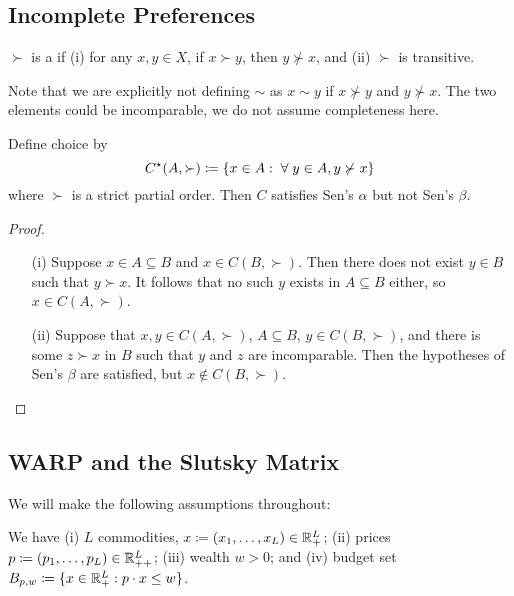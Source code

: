 \documentclass[12pt]{article}
\begin{document}
\subsection{Incomplete Preferences}

\begin{definition}
	$\succ$ is a  if (i) for any $x,y \in X$, if $x \succ y$, then $y \not\succ x$, and (ii) $\succ$ is transitive.
\end{definition}
\begin{remark}
	Note that we are explicitly not defining $\sim$ as $x \sim y$ if $x \not\succ y$ and $y \not\succ x$. The two elements could be incomparable, we do not assume completeness here.
\end{remark}

\begin{proposition}\label{prop:partial_order}
	Define choice by
	\[
	C\opt(A,\succ) \coloneqq \{x \in A : \forall y \in A, y\not\succ x\}
	\]
	where $\succ$ is a strict partial order. Then $C$ satisfies Sen's $\alpha$ but not Sen's $\beta$.
\end{proposition}
\begin{proof}
	
	\begin{itemize}
		\item[(i)] Suppose $x \in A \subseteq B$ and $x \in C(B,\succ)$. Then there does not exist $y \in B$ such that $y \succ x$. It follows that no such $y$ exists in $A \subseteq B$ either, so $x \in C(A,\succ)$.
		
		\item[(ii)] Suppose that $x,y \in C(A,\succ)$, $A \subseteq B$, $y \in C(B,\succ)$, and there is some $z \succ x$ in $B$ such that $y$ and $z$ are incomparable. Then the hypotheses of Sen's $\beta$ are satisfied, but $x \not\in C(B,\succ)$.
	\end{itemize}
\end{proof}

\subsection{WARP and the Slutsky Matrix}

We will make the following assumptions throughout:

\begin{assumption}\label{ass:consumer_struc}
	We have (i) $L$ commodities, $x \coloneqq (x_1,\dots,x_L) \in \mathbb{R}^L_+$; (ii) prices $p \coloneqq (p_1,\dots,p_L) \in \mathbb{R}^L_{++}$; (iii) wealth $w > 0$; and (iv) budget set $B_{p,w} \coloneqq \{x \in \mathbb{R}^L_+ : p\cdot x \le w\}$.
\end{assumption}
\end{document}
